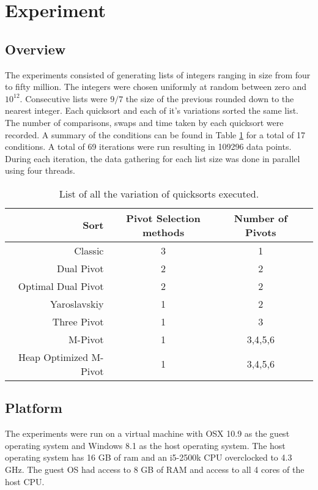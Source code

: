 

\section{Experiment}
	\label{sec:Experiment}
	\subsection{Overview}
	The experiments consisted of generating lists of integers ranging in size from four to fifty million. The integers were chosen uniformly at random between zero and $10^{12}$. Consecutive lists were $9/7$ the size of the previous rounded down to the nearest integer. Each quicksort and each of it's variations sorted the same list. The number of comparisons, swaps and time taken by each quicksort were recorded. A summary of the conditions can be found in Table \ref{tab:experimentConditions} for a total of 17 conditions. A total of 69 iterations were run resulting in 109296 data points. During each iteration, the data gathering for each list size was done in parallel using four threads.

	\begin{table}
		\begin{center}
			\begin{tabular}{|r|c|c|c}
				\hline
				Sort           			&  Pivot Selection methods 	& Number of Pivots 	\\ \hline \hline
				Classic                 &  3 						& 1       			\\ \hline
				Dual Pivot              &  2  						& 2       			\\ \hline
				Optimal Dual Pivot      &  2  						& 2       			\\ \hline
				Yaroslavskiy            &  1  						& 2       			\\ \hline
				Three Pivot             &  1  						& 3       			\\ \hline
				M-Pivot                 &  1  						& 3,4,5,6 			\\ \hline
				Heap Optimized M-Pivot  &  1  						& 3,4,5,6 			\\ \hline
			\end{tabular}
			\caption{List of all the variation of quicksorts executed.}
			\label{tab:experimentConditions}
		\end{center}
	\end{table}


	\subsection{Platform}
	The experiments were run on a virtual machine with OSX 10.9 as the guest operating system and Windows 8.1 as the host operating system. The host operating system has 16 GB of ram and an i5-2500k CPU overclocked to 4.3 GHz. The guest OS had access to 8 GB of RAM and access to all 4 cores of the host CPU.

